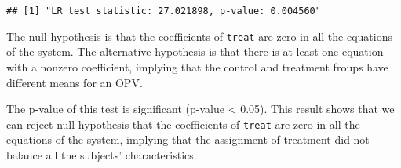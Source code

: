 \documentclass[
]{article}
\newenvironment{Shaded}{\begin{snugshade}}{\end{snugshade}}
\newcommand{\AttributeTok}[1]{\textcolor[rgb]{0.13,0.29,0.53}{#1}}
\newcommand{\CommentTok}[1]{\textcolor[rgb]{0.56,0.35,0.01}{\textit{#1}}}
\newcommand{\ConstantTok}[1]{\textcolor[rgb]{0.56,0.35,0.01}{#1}}
\newcommand{\ControlFlowTok}[1]{\textcolor[rgb]{0.13,0.29,0.53}{\textbf{#1}}}
\newcommand{\DecValTok}[1]{\textcolor[rgb]{0.00,0.00,0.81}{#1}}
\newcommand{\FunctionTok}[1]{\textcolor[rgb]{0.13,0.29,0.53}{\textbf{#1}}}
\newcommand{\NormalTok}[1]{#1}
\newcommand{\OtherTok}[1]{\textcolor[rgb]{0.56,0.35,0.01}{#1}}
\newcommand{\SpecialCharTok}[1]{\textcolor[rgb]{0.81,0.36,0.00}{\textbf{#1}}}
\newcommand{\StringTok}[1]{\textcolor[rgb]{0.31,0.60,0.02}{#1}}
\begin{document}
\begin{Shaded}
\end{Shaded}

\begin{verbatim}
## [1] "LR test statistic: 27.021898, p-value: 0.004560"
\end{verbatim}

The null hypothesis is that the coefficients of \texttt{treat} are zero
in all the equations of the system. The alternative hypothesis is that
there is at least one equation with a nonzero coefficient, implying that
the control and treatment froups have different means for an OPV.

The p-value of this test is significant (p-value \textless{} 0.05). This
result shows that we can reject null hypothesis that the coefficients of
\texttt{treat} are zero in all the equations of the system, implying
that the assignment of treatment did not balance all the subjects'
characteristics.
\end{document}

